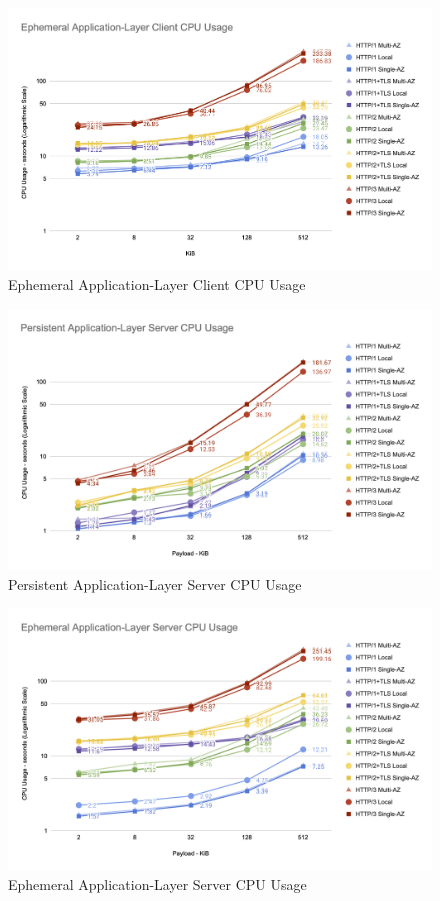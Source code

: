 \begin{figure}[h!]
    \centering
    \includegraphics[width=\linewidth]{figures/charts/Ephemeral Application-Layer Client CPU Usage.png}
    \caption{Ephemeral Application-Layer Client CPU Usage}
    \label{fig:ephemeral_client_app_cpu}
\end{figure}

\clearpage

\begin{figure}[h!]
    \centering
    \includegraphics[width=\linewidth]{figures/charts/Persistent Application-Layer Server CPU Usage.png}
    \caption{Persistent Application-Layer Server CPU Usage}
    \label{fig:persistent_server_app_cpu}
\end{figure}

\begin{figure}[h!]
    \centering
    \includegraphics[width=\linewidth]{figures/charts/Ephemeral Application-Layer Server CPU Usage.png}
    \caption{Ephemeral Application-Layer Server CPU Usage}
    \label{fig:ephemeral_server_app_cpu}
\end{figure}

\clearpage
